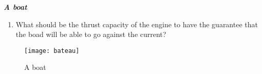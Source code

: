 \begin{exercice}{\bf \em A boat}
\begin{enumerate}
\begin{itemize}
\end{itemize}
\item What should be the thrust capacity of the engine to have the guarantee that the boad will be able to go against the current?
\end{enumerate} 
\begin{figure}[h]
\begin{center}
\texttt{[image: bateau]}
\caption{A boat}
\label{bateau}
\end{center}
\end{figure}
\end{exercice}
\vv


